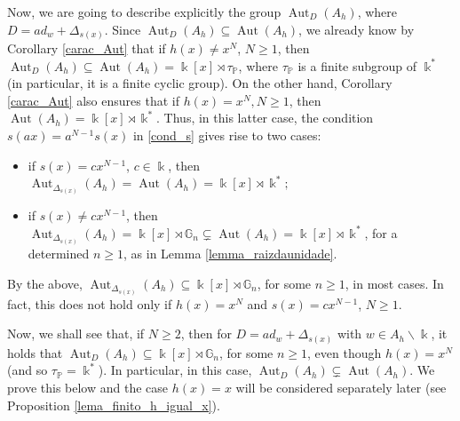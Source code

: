 \documentclass{article}
\numberwithin{equation}{section}\theoremstyle{plain}
\DeclareMathOperator{\Aut}{Aut}
\begin{document}
\medbreak



Now, we are going to describe explicitly the group $\Aut_D(A_h)$, where $D=ad_w + \Delta_{s(x)}$.
Since $\Aut_D(A_h) \subseteq \Aut(A_h)$, we already know by Corollary \ref{carac_Aut} that if $h(x) \neq x^N$, $N \geq 1$,  then
$\Aut_D(A_h) \subseteq \Aut(A_h) = \Bbbk[x] \rtimes \tau_{\mathbb{P}}$,
where $\tau_{\mathbb{P}}$ is a finite subgroup of $\Bbbk^\ast$ (in particular, it is a finite cyclic group). 
On the other hand, Corollary \ref{carac_Aut} also ensures that if $h(x)=x^N, N \geq 1$, then $\Aut(A_h)=\Bbbk[x] \rtimes \Bbbk^\ast$.
    Thus, in this latter case, the condition $s(ax)=a^{N-1} s(x)$ in \eqref{cond_s} gives rise to two cases:
    \begin{itemize}
        \item[i)] if $s(x)= c x^{N-1}$, $c \in \Bbbk$, then $\Aut_{\Delta_{s(x)}}(A_h) = \Aut(A_h) = \Bbbk[x] \rtimes \Bbbk^\ast;$
        \item[ii)] if $s(x) \neq c x^{N-1}$, then $\Aut_{\Delta_{s(x)}}(A_h) = \Bbbk[x] \rtimes \mathbb{G}_n \subsetneq \Aut(A_h) = \Bbbk[x] \rtimes \Bbbk^\ast$, for a determined $n \geq 1$, as in Lemma \ref{lemma_raizdaunidade}.
    \end{itemize}
    


By the above, $\Aut_{\Delta_{s(x)}}(A_h) \subseteq \Bbbk[x] \rtimes \mathbb{G}_n$, for some $n \geq 1$, in most cases.
In fact, this does not hold only if $h(x)=x^N$ and $s(x) = cx^{N-1}$, $N \geq 1$.

\medbreak

Now, we shall see that, if $N \geq 2$, then for $D=ad_w+\Delta_{s(x)}$ with $w \in A_h\backslash \Bbbk$, it holds that $\Aut_D(A_h) \subseteq \Bbbk[x] \rtimes \mathbb{G}_n$, for some $n \geq 1$, even though $h(x) = x^N$ (and so $\tau_{\mathbb{P}} = \Bbbk^\ast$).
In particular, in this case, $\Aut_D(A_h) \subsetneq \Aut(A_h)$.
We prove this below and the case $h(x)=x$ will be considered separately later (see Proposition \ref{lema_finito_h_igual_x}).
\end{document}
